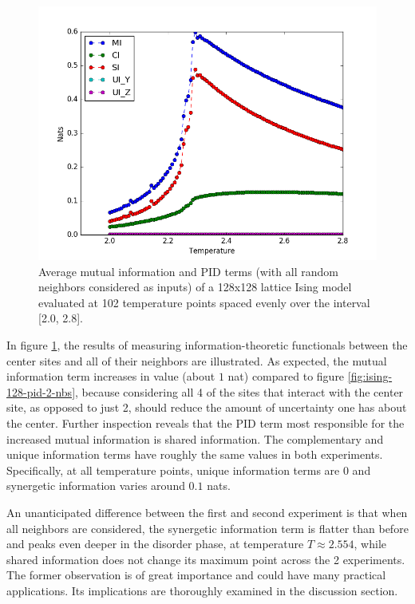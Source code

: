 \documentclass[12pt]{article}
\begin{document}
\begin{figure} [h]
\begin{center}
\includegraphics[width=.9\textwidth]{ising-128-pid-4-nbs}
\caption{Average mutual information and PID terms (with all random neighbors considered as inputs) of a 128x128 lattice Ising model evaluated at 102 temperature points spaced evenly over the interval [2.0, 2.8].}
\label{fig:ising-128-pid-4-nbs}
\end{center}
\end{figure}

In figure \ref{fig:ising-128-pid-4-nbs}, the results of measuring information-theoretic functionals between the center sites and all of their neighbors are illustrated. As expected, the mutual information term increases in value (about $1$ nat) compared to figure \ref{fig:ising-128-pid-2-nbs}, because considering all 4 of the sites that interact with the center site, as opposed to just 2, should reduce the amount of uncertainty one has about the center. Further inspection reveals that the PID term most responsible for the increased mutual information is shared information. The complementary and unique information terms have roughly the same values in both experiments. Specifically, at all temperature points, unique information terms are $0$ and synergetic information varies around $0.1$ nats. 

An unanticipated difference between the first and second experiment is that when all neighbors are considered, the synergetic information term is flatter than before and peaks even deeper in the disorder phase, at temperature $T \approx 2.554$, while shared information does not change its maximum point across the 2 experiments. The former observation is of great importance and could have many practical applications. Its implications are thoroughly examined in the discussion section. 
\end{document}
